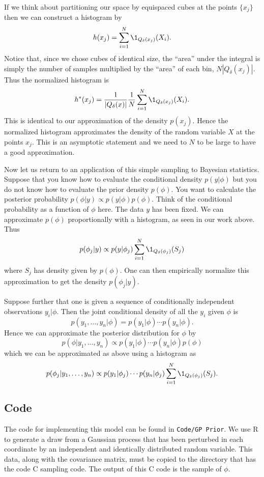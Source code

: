 \documentclass{report}
\begin{document}
If we think about partitioning our space by equispaced cubes at the points $\{x_j\}$ then we can construct a histogram by
\[
h(x_j) = \sum_{i=1}^N \1_{Q_\delta(x_j)}(X_i).
\]
Notice that, since we chose cubes of identical size, the ``area'' under the integral is simply the number of samples multiplied by the ``area'' of each bin, $N | Q_\delta(x_j) |$.  Thus the normalized histogram is
\[
h^*(x_j) = \frac{1}{|Q_\delta(x)|}\frac{1}{N} \sum_{i=1}^N \1_{Q_\delta(x_j)}(X_i).
\]
This is identical to our approximation of the density $p(x_j)$.  Hence the normalized histogram approximates the density of the random variable $X$ at the points $x_j$.  This is an asymptotic statement and we need to $N$ to be large to have a good approximation.

Now let us return to an application of this simple sampling to Bayesian statistics.  Suppose that you know how to evaluate the conditional density $p(y|\phi)$ but you do not know how to evaluate the prior density $p(\phi)$.  You want to calculate the posterior probability $p(\phi | y) \propto p(y | \phi) p(\phi)$.  Think of the conditional probability as a function of $\phi$ here.  The data $y$ has been fixed.  We can approximate $p(\phi)$ proportionally with a histogram, as seen in our work above.  Thus
\[
p(\phi_j | y) \propto p(y|\phi_j) \sum_{i=1}^N \1_{Q_\delta(\phi_j)}(S_j)
\]
where $S_j$ has density given by $p(\phi)$.  One can then empirically normalize this approximation to get the density $p(\phi_j | y)$.

Suppose further that one is given a sequence of conditionally independent observations $y_i | \phi$.  Then the joint conditional density of all the $y_i$ given $\phi$ is
\[
p(y_1, \ldots, y_n | \phi) = p(y_1 | \phi) \cdots p(y_n | \phi).
\]
Hence we can approximate the posterior distribution for $\phi$ by
\[
p(\phi | y_1, \ldots, y_n) \propto p(y_1 | \phi) \cdots p(y_n | \phi) p(\phi)
\]
which we can be approximated as above using a histogram as
\[
p(\phi_j | y_1, \ldots, y_n) \propto p(y_1 | \phi_j) \cdots p(y_n | \phi_j) \sum_{i=1}^N \1_{Q_\delta(\phi_j)}(S_j).
\]

\subsection{Code}

The code for implementing this model can be found in \texttt{Code/GP Prior}.  We use R to generate a draw from a Gaussian process that has been perturbed in each coordinate by an independent and identically distributed random variable.  This data, along with the covariance matrix, must be copied to the directory that has the code C sampling code.  The output of this C code is the sample of $\phi$.
\end{document}
